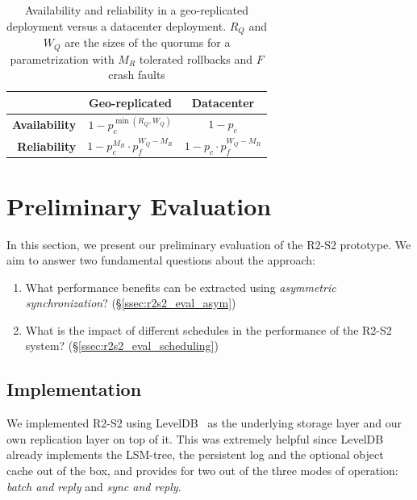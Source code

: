 \begin{table}[ht]
    \centering
    \caption{Availability and reliability in a geo-replicated
    deployment versus a datacenter deployment. $R_Q$ and $W_Q$
    are the sizes of the quorums for a parametrization with $M_R$
    tolerated rollbacks and $F$ crash faults}\label{tab:parametrization}
    \begin{tabular}{|r||c|c|}
        \hline
        & \textbf{Geo-replicated} & \textbf{Datacenter} \\ \hline
        \textbf{Availability} & $1 - p_c^{\min(R_Q, W_Q)}$ & $1 - p_c$ \\ \hline
        \textbf{Reliability}  & $1 - p_c^{M_R} \cdot p_f^{W_Q - M_R}$ & $1 - p_c \cdot p_f^{W_Q - M_R}$ \\ \hline
    \end{tabular}\label{tab:parametrization}
\end{table}



\section{Preliminary Evaluation}\label{sec:r2s2evaluation}

In this section, we present our preliminary evaluation of the
\ac{R2-S2} prototype. We aim to answer two fundamental questions
about the approach:

\begin{enumerate}
    \item What performance benefits can be extracted using
        \emph{asymmetric synchronization}?
        (\S\ref{ssec:r2s2_eval_asym})
    \item What is the impact of different schedules in the
        performance of the \ac{R2-S2} system?
        (\S\ref{ssec:r2s2_eval_scheduling})
\end{enumerate}

\subsection{Implementation}\label{sec:r2s2implementation}

We implemented \ac{R2-S2} using LevelDB~\cite{leveldb} as the
underlying storage layer and our own replication layer on top of
it. This was extremely helpful since LevelDB already implements
the \ac{LSM-tree}, the persistent log and the optional object cache
out of the box, and provides for two out of the three modes of
operation: \emph{batch and reply} and \emph{sync and reply}.

